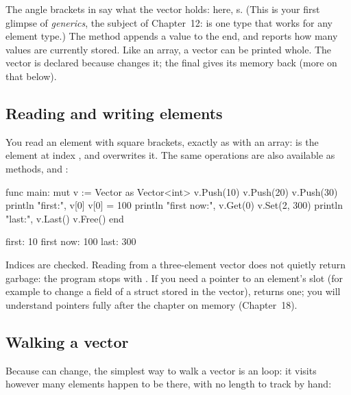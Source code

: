 The angle brackets in  say what the vector holds: here,
s. (This is your first glimpse of \emph{generics}, the subject of
Chapter~12:  is one type that works for any element type.) The
 method appends a value to the end, and  reports how
many values are currently stored. Like an array, a vector can be printed whole.
The vector is declared  because  changes it; the final
 gives its memory back (more on that below).

\subsection{Reading and writing elements}

You read an element with square brackets, exactly as with an array:
 is the element at index , and 
overwrites it. The same operations are also available as methods,
 and :

\begin{salamen}
func main:
    mut v := Vector {} as Vector<int>
    v.Push(10)
    v.Push(20)
    v.Push(30)
    println "first:", v[0]
    v[0] = 100
    println "first now:", v.Get(0)
    v.Set(2, 300)
    println "last:", v.Last()
    v.Free()
end
\end{salamen}

\begin{progout}
first: 10
first now: 100
last: 300
\end{progout}

\begin{note}
Indices are checked. Reading  from a three-element vector does not
quietly return garbage: the program stops with
. If you need a pointer to an
element's slot (for example to change a field of a struct stored in the vector),
 returns one; you will understand pointers fully after the chapter
on memory (Chapter~18).
\end{note}

\subsection{Walking a vector}

Because  can change, the simplest way to walk a vector is an
 loop: it visits however many elements happen to be there, with no
length to track by hand:

